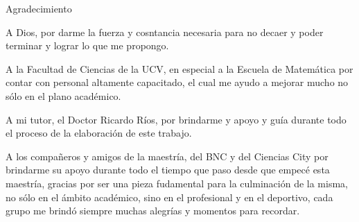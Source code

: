 \vspace*{2.5cm}

\begin{center}
{\large Agradecimiento}
\end{center}
\vspace{1cm}

\hspace*{0.4 cm} A Dios, por darme la fuerza y cosntancia necesaria para no decaer y poder terminar y lograr lo que me propongo.

\hspace*{0.4 cm} A la Facultad de Ciencias de la UCV, en especial a la Escuela de Matem\'atica por contar con personal altamente capacitado, el cual me ayudo a mejorar mucho no s\'olo en el plano acad\'emico.

\hspace*{0.4 cm} A mi tutor, el Doctor Ricardo R\'ios, por brindarme y apoyo y gu\'ia durante todo el proceso de la elaboraci\'on de este trabajo.

\hspace*{0.4 cm} A los compa\~neros y amigos de la maestr\'ia, del BNC y del Ciencias City por brindarme su apoyo durante todo el tiempo que paso desde que empec\'e esta maestr\'ia,  gracias por ser una pieza fudamental para la culminaci\'on de la misma, no s\'olo en el \'ambito acad\'emico, sino en el profesional y en el deportivo, cada grupo me brind\'o siempre muchas alegr\'ias y momentos para recordar.





\newpage
